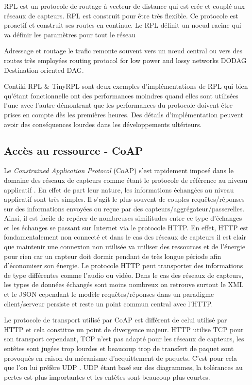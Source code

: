 RPL est un protocole de routage à vecteur de distance qui est crée et couplé
aux réseaux de capteurs. RPL est construit pour être très flexible. Ce
protocole est proactif et construit ses routes en continue. Le RPL définit un
noeud racine qui va définir les paramètres pour tout le réseau

Adressage et routage le trafic remonte souvent vers un nœud central ou vers
des routes très employées routing protocol for low power and lossy networks
DODAG Destination oriented DAG.

Contiki RPL \& TinyRPL sont deux exemples d'implémentations de RPL qui bien
qu'étant fonctionnelle ont des performances moindres quand elles sont utilisées
l'une avec l'autre \cite{ko11contikirpl} démontrant que les performances du
protocole doivent être prises en compte dès les premières heures. Des détails
d'implémentation peuvent avoir des conséquences lourdes dans les développements
ultérieurs.

\subsection{Accès au ressource - CoAP}

Le \textit{Constrained Application Protocol} (CoAP) s'est rapidement imposé
dans le domaine des réseaux de capteurs comme étant le protocole de référence
au niveau applicatif \cite{coap, coapdesign, kovatsch11low-power}. En effet de
part leur nature, les informations échangées au niveau applicatif sont très
simples. Il s'agit le plus souvent de couples requêtes/réponses sur des
informations envoyées ou reçue par des capteurs/aggrégateur/passerelles. Ainsi,
il est facile de repérer de nombreuses similitudes entre ce type d'échanges et
les échanges se passant sur Internet via le protocole HTTP. En effet, HTTP est
fondamentalement non connecté et dans le cas des réseaux de capteurs il est
clair que maintenir une connexion non utilisée va utiliser des ressources et de
l'énergie pour rien car un capteur doit dormir pendant de très longue période
afin d'économiser son énergie.  Le protocole HTTP peut transporter des
informations de type différentes comme l'audio ou vidéo. Dans le cas des
réseaux de capteurs, les types de données échangés sont moins nombreux on
retrouve surtout le XML et le JSON cependant le modèle requêtes/réponses dans
un paradigme client/serveur persiste et reste un point commun central avec
l'HTTP.

Le protocole de transport utilisé par CoAP est différent de celui utilisé par
HTTP et cela constitue un point de divergence majeur. HTTP utilise TCP pour son
transport cependant, TCP n'est pas adapté pour les réseaux de capteurs, les
entêtes sont jugées trop lourdes et beaucoup trop de transfert de paquet sont
provoqués en raison du mécanisme d'acquittement de paquets. C'est pour cela que
l'on lui préfère UDP \cite{coap-web}. UDP étant basé sur des diagrammes, la tolérances
au pertes est plus importantes et les entêtes sont beaucoup plus courtes.

